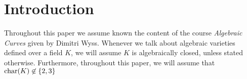 \section*{Introduction}

Throughout this paper we assume known the content of the course \emph{Algebraic
Curves} given by Dimitri Wyss.
Whenever we talk about algebraic varieties defined over a field $K$, we
will assume $K$ is algebraically closed, unless stated otherwise.
Furthermore, throughout this paper, we will assume that
$\operatorname{char}(K) \not\in \{2, 3\}$
